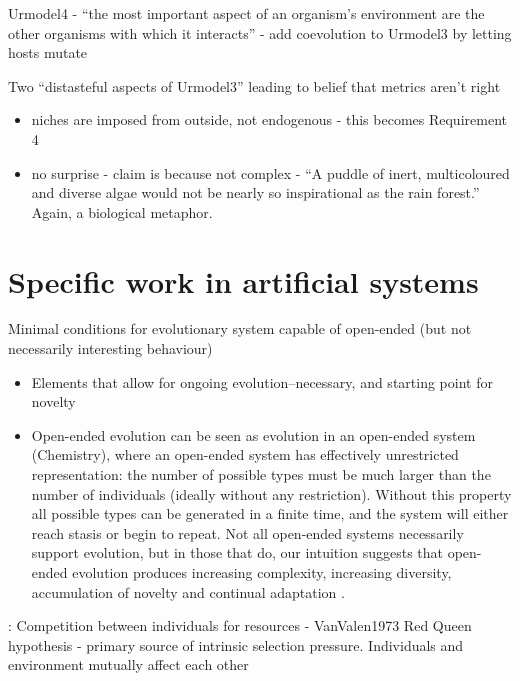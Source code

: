 	
	Urmodel4 - ``the most important aspect of an organism's environment
	are the other organisms with which it interacts'' - add coevolution to
	Urmodel3 by letting hosts mutate
	
	Two ``distasteful aspects of Urmodel3'' leading to belief that metrics
	aren't right
	
	
	\begin{itemize}
		\item
		
		niches are imposed from outside, not endogenous - this becomes
		Requirement 4
		
		\item
		
		no surprise - claim is because not complex - ``A puddle of inert,
		multicoloured and diverse algae would not be nearly so inspirational
		as the rain forest.'' Again, a biological metaphor.
		
	\end{itemize}


\section{Specific work in artificial systems}

Minimal conditions for evolutionary system capable of open-ended (but not necessarily interesting behaviour)

\begin{itemize}
	\item
	      Elements that allow for ongoing evolution--necessary, and starting
	      point for novelty
	\item
	      Open-ended evolution can be seen as evolution in an open-ended system
	      (\eg Chemistry), where an open-ended system has effectively
	      unrestricted representation: the number of possible types must be much
	      larger than the number of individuals (ideally without any
	      restriction). Without this property all possible types can be
	      generated in a finite time, and the system will either reach stasis or
	      begin to repeat. Not all open-ended systems necessarily support
	      evolution, but in those that do, our intuition suggests that
	      open-ended evolution produces increasing complexity, increasing
	      diversity, accumulation of novelty and continual adaptation
	      \autocite{Lehman2012}.
\end{itemize}

\autocite{Taylor2001}:
	Competition between individuals for resources - VanValen1973 Red Queen
	hypothesis - primary source of intrinsic selection pressure.
	Individuals and environment mutually affect each other
	
